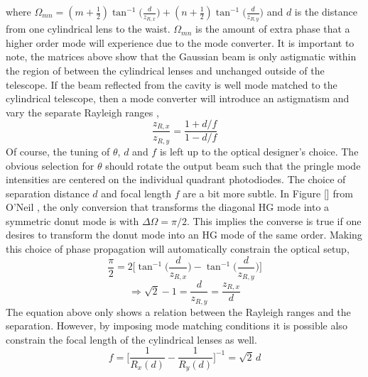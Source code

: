 where $ \Omega_{mn} = (m+\frac{1}{2}) \tan^{-1}\bigg(\frac{d}{z_{R,x}}\bigg) + (n+\frac{1}{2}) \tan^{-1}\bigg(\frac{d}{z_{R,y}}\bigg) $ and $d$ is the distance from one cylindrical lens to the waist.  $\Omega_{mn}$ is the amount of extra phase that a higher order mode will experience due to the mode converter.  It is important to note, the matrices above show that the Gaussian beam is only astigmatic within the region of between the cylindrical lenses and unchanged outside of the telescope.   If the beam reflected from the cavity is well mode matched to the cylindrical telescope, then a mode converter will introduce an astigmatism and vary the separate Rayleigh ranges \cite{BEIJERSBERGEN},
\begin{equation}
\frac{z_{R,x}}{z_{R,y}} = \frac{1+d/f}{1-d/f}
\end{equation}
Of course, the tuning of $\theta$, $d$ and $f$ is left up to the optical designer's choice.  The obvious selection for $\theta$ should rotate the output beam such that the pringle mode intensities are centered on the individual quadrant photodiodes.  The choice of separation distance $d$ and focal length $f$ are a bit more subtle.  In Figure [] from O'Neil \cite{ONeilModeTransform}, the only conversion that transforms the diagonal HG mode into a symmetric donut mode is with $\Delta \Omega = \pi/2$. This implies the converse is  true if one desires to transform the donut mode into an HG mode of the same order. Making this choice of phase propagation will automatically constrain the optical setup,
	\begin{equation}
	\frac{\pi}{2} = 2\bigg[\tan^{-1}\bigg(\frac{d}{z_{R,x}}\bigg) - \tan^{-1} \bigg(\frac{d}{z_{R,y}} \bigg)  \bigg]
	\end{equation} 
	\begin{equation}
	  \Rightarrow \sqrt{2} - 1 = \frac{d}{z_{R,y}} = \frac{z_{R,x}}{d}
	\end{equation}
The equation above only shows a relation between the Rayleigh ranges and the separation. However, by imposing mode matching conditions it is possible also constrain the focal length of the cylindrical lenses as well.
	\begin{equation}
	f = \bigg[\frac{1}{R_x(d)} - \frac{1}{R_y(d)}\bigg]^{-1} = \sqrt{2}\,d
	\end{equation}

